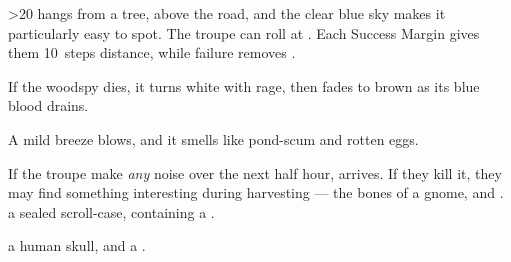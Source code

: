 \ifnum\thefenestraDay>20%
 hangs from a tree, above the road, and the clear blue sky makes it particularly easy to spot.
The troupe can roll  at \tn[10].
Each Success Margin gives them 10~\glspl{step} distance, while failure removes .

\woodspy

If the \gls{woodspy} dies, it turns white with rage, then fades to brown as its blue blood drains.

\else%
\begin{boxtext}
  A mild breeze blows, and it smells like pond-scum and rotten eggs.
\end{boxtext}

If the troupe make \emph{any} noise over the next half hour,  arrives.
\ifodd\day
  If they kill it, they may find something interesting during \gls{harvesting} ---
  \ifcase\value{r3}\relax\or%
    the bones of a gnome, and \lootBig.
  \or%
    a sealed scroll-case, containing a \crystalMaul.

    \showTalisman
  \else%
    a human skull, and a \lootJewellery.
  \fi
\fi

\basilisk

\fi
